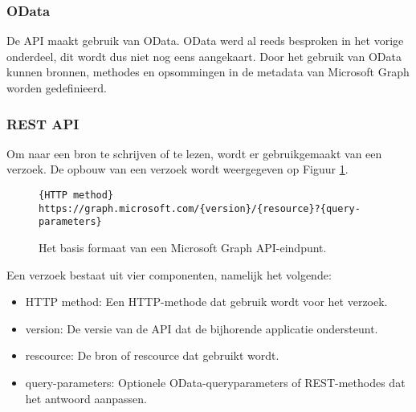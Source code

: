 \subsubsection{OData}

De \ac{API} maakt gebruik van OData. OData werd al reeds besproken in het vorige onderdeel, dit wordt dus niet nog eens aangekaart. Door het gebruik van OData kunnen bronnen, methodes en opsommingen in de metadata van Microsoft Graph worden gedefinieerd.

\subsubsection{REST API}

Om naar een bron te schrijven of te lezen, wordt er gebruikgemaakt van een verzoek. De opbouw van een verzoek wordt weergegeven op Figuur \ref{RAM}. \\

\begin{figure}[h]
    \footnotesize\begin{verbatim}{HTTP method} https://graph.microsoft.com/{version}/{resource}?{query-parameters}
    \end{verbatim}    
    \caption[Basis formaat Microsoft Graph API-eindpunt]{Het basis formaat van een Microsoft Graph \Ac{API}-eindpunt.}
    \label{RAM}
\end{figure}

Een verzoek bestaat uit vier componenten, namelijk het volgende:

\begin{itemize}
    \item \ac{HTTP} method: Een \ac{HTTP}-methode dat gebruik wordt voor het verzoek.
    \item version: De versie van de \ac{API} dat de bijhorende applicatie ondersteunt.
    \item rescource: De bron of rescource dat gebruikt wordt.
    \item query-parameters: Optionele OData-queryparameters of \Ac{REST}-methodes dat het antwoord aanpassen.
\end{itemize}

\begin{comment}
Wanneer er een verzoek wordt verstuurd, krijgt dit ook een antwoord terug. Een antwoord bestaat uit minstens volgende onderdelen: 

\begin{itemize}
    \item Status code:
    \item Response message:
    \item @odata.nextLink:
\end{itemize}
\end{comment}

